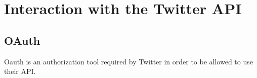 \chapter{Interaction with the Twitter \ac{API}}

\section{OAuth}
Oauth is an authorization tool required by Twitter in order to be allowed to use
their \ac{API}.
